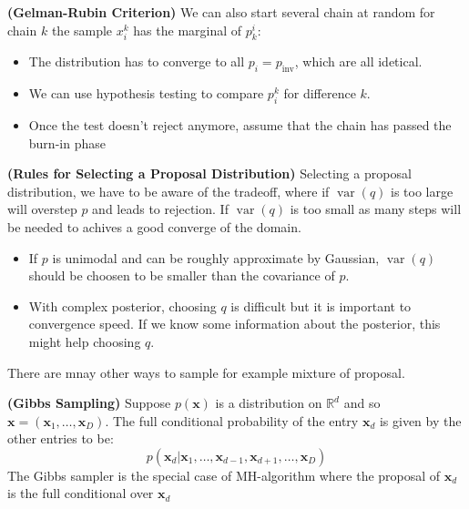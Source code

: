 \begin{definition}{\textbf{(Gelman-Rubin Criterion)}}
    We can also start several chain at random for chain $k$ the sample $x^k_i$ has the marginal of $p^i_k$:
    \begin{itemize}
        \item The distribution has to converge to all $p_i = p_\text{inv}$, which are all idetical. 
        \item We can use hypothesis testing to compare $p^k_i$ for difference $k$. 
        \item Once the test doesn't reject anymore, assume that the chain has passed the burn-in phase
    \end{itemize}
\end{definition}

\begin{remark}{\textbf{(Rules for Selecting a Proposal Distribution)}}
    Selecting a proposal distribution, we have to be aware of the tradeoff, where if $\operatorname{var}(q)$ is too large will overstep $p$ and leads to rejection. If $\operatorname{var}(q)$ is too small as many steps will be needed to achives a good converge of the domain. 
    \begin{itemize}
        \item If $p$ is unimodal and can be roughly approximate by Gaussian, $\operatorname{var}(q)$ should be choosen to be smaller than the covariance of $p$.
        \item With complex posterior, choosing $q$ is difficult but it is important to convergence speed. If we know some information about the posterior, this might help choosing $q$. 
    \end{itemize}
    There are mnay other ways to sample for example mixture of proposal. 
\end{remark}

\begin{definition}{\textbf{(Gibbs Sampling)}}
    Suppose $p(\boldsymbol x)$ is a distribution on $\mathbb{R}^d$ and so $\boldsymbol x = (\boldsymbol x_1,\dots, \boldsymbol x_D)$. The full conditional probability of the entry $\boldsymbol x_d$ is given by the other entries to be:
    \begin{equation*}
        p(\boldsymbol x_d | \boldsymbol x_1,\dots,\boldsymbol x_{d-1},\boldsymbol x_{d+1},\dots,\boldsymbol x_D)
    \end{equation*}
    The Gibbs sampler is the special case of MH-algorithm where the proposal of $\boldsymbol x_d$ is the full conditional over $\boldsymbol x_d$
\end{definition}

